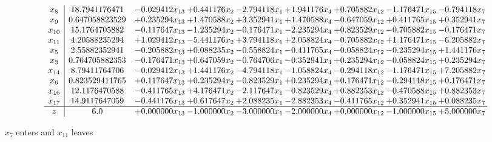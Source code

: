 \documentclass[10pt]{article}
\begin{document}
 \[\begin{array}{c| c c@{\hskip 2pt} c@{\hskip 2pt} c@{\hskip 2pt} c@{\hskip 2pt} c@{\hskip 2pt} c@{\hskip 2pt} c@{\hskip 2pt} }
 x_{8}   &  18.7941176471 & -0.029412 x_{13} & + 0.441176 x_{2} & -2.794118 x_{1} & + 1.941176 x_{4} & + 0.705882 x_{12} & -1.176471 x_{15} & -0.794118 x_{7}\\
 x_{9}   &  0.647058823529 & + 0.235294 x_{13} & + 1.470588 x_{2} & + 3.352941 x_{1} & + 1.470588 x_{4} & -0.647059 x_{12} & + 0.411765 x_{15} & + 0.352941 x_{7}\\
 x_{10}   &  15.1764705882 & -0.117647 x_{13} & -1.235294 x_{2} & -0.176471 x_{1} & -2.235294 x_{4} & + 0.823529 x_{12} & -0.705882 x_{15} & -0.176471 x_{7}\\
 x_{11}   &  4.20588235294 & + 1.029412 x_{13} & -5.441176 x_{2} & + 3.794118 x_{1} & + 2.058824 x_{4} & -0.705882 x_{12} & + 1.176471 x_{15} & -6.205882 x_{7}\\
 x_{5}   &  2.55882352941 & -0.205882 x_{13} & + 0.088235 x_{2} & -0.558824 x_{1} & -0.411765 x_{4} & -0.058824 x_{12} & -0.235294 x_{15} & + 1.441176 x_{7}\\
 x_{3}   &  0.764705882353 & -0.176471 x_{13} & + 0.647059 x_{2} & -0.764706 x_{1} & -0.352941 x_{4} & + 0.235294 x_{12} & -0.058824 x_{15} & + 0.235294 x_{7}\\
 x_{14}   &  8.79411764706 & -0.029412 x_{13} & + 1.441176 x_{2} & -4.794118 x_{1} & -1.058824 x_{4} & -0.294118 x_{12} & -1.176471 x_{15} & + 7.205882 x_{7}\\
 x_{6}   &  0.823529411765 & + 0.117647 x_{13} & + 0.235294 x_{2} & -0.823529 x_{1} & + 0.235294 x_{4} & + 0.176471 x_{12} & -0.294118 x_{15} & + 0.176471 x_{7}\\
 x_{16}   &  12.1176470588 & -0.411765 x_{13} & + 4.176471 x_{2} & -2.117647 x_{1} & -0.823529 x_{4} & + 0.882353 x_{12} & -0.470588 x_{15} & + 0.882353 x_{7}\\
 x_{17}   &  14.9117647059 & -0.441176 x_{13} & + 0.617647 x_{2} & + 2.088235 x_{1} & -2.882353 x_{4} & -0.411765 x_{12} & + 0.352941 x_{15} & + 0.088235 x_{7}\\
\hline
z    &  6.0 & + 0.000000 x_{13} & -1.000000 x_{2} & -3.000000 x_{1} & -2.000000 x_{4} & + 0.000000 x_{12} & -1.000000 x_{15} & + 5.000000 x_{7}\\
\end{array}\]


 $ x_{7} $ enters and $ x_{11} $ leaves 
\end{document}
